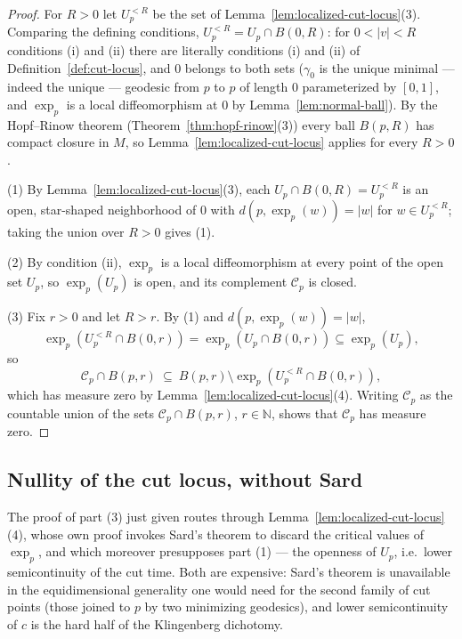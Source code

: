 \begin{proof}
For $R>0$ let $U_p^{<R}$ be the set of
Lemma~\ref{lem:localized-cut-locus}(3). Comparing the defining
conditions, $U_p^{<R}=U_p\cap B(0,R)$: for $0<|v|<R$ conditions
(i) and (ii) there are literally conditions (i) and (ii) of
Definition~\ref{def:cut-locus}, and $0$ belongs to both sets
($\gamma_0$ is the unique minimal --- indeed the unique ---
geodesic from $p$ to $p$ of length $0$ parameterized by $[0,1]$,
and $\exp_p$ is a local diffeomorphism at $0$ by
Lemma~\ref{lem:normal-ball}). By the Hopf--Rinow theorem
(Theorem~\ref{thm:hopf-rinow}(3)) every ball $B(p,R)$ has compact
closure in $M$, so Lemma~\ref{lem:localized-cut-locus} applies for
every $R>0$.

(1) By Lemma~\ref{lem:localized-cut-locus}(3), each
$U_p\cap B(0,R)=U_p^{<R}$ is an open, star-shaped neighborhood of
$0$ with $d(p,\exp_p(w))=|w|$ for $w\in U_p^{<R}$; taking the
union over $R>0$ gives (1).

(2) By condition (ii), $\exp_p$ is a local diffeomorphism at
every point of the open set $U_p$, so
$\exp_p(U_p)$ is open, and its complement ${\mathcal C}_p$ is
closed.

(3) Fix $r>0$ and let $R>r$. By (1) and
$d(p,\exp_p(w))=|w|$,
$$\exp_p\left(U_p^{<R}\cap B(0,r)\right)
=\exp_p\left(U_p\cap B(0,r)\right)\subseteq\exp_p(U_p),$$
so
$${\mathcal C}_p\cap B(p,r)\ \subseteq\
B(p,r)\setminus\exp_p\left(U_p^{<R}\cap B(0,r)\right),$$
which has measure zero by
Lemma~\ref{lem:localized-cut-locus}(4). Writing ${\mathcal C}_p$
as the countable union of the sets ${\mathcal C}_p\cap B(p,r)$,
$r\in\mathbb{N}$, shows that ${\mathcal C}_p$ has measure zero.
\end{proof}

\subsection*{Nullity of the cut locus, without Sard}

The proof of part (3) just given routes through
Lemma~\ref{lem:localized-cut-locus}(4), whose own proof invokes Sard's
theorem to discard the critical values of $\exp_p$, and which
moreover presupposes part (1) --- the openness of $U_p$, i.e.\ lower
semicontinuity of the cut time. Both are expensive: Sard's theorem is
unavailable in the equidimensional generality one would need for the
second family of cut points (those joined to $p$ by two minimizing
geodesics), and lower semicontinuity of $c$ is the hard half of the
Klingenberg dichotomy.

